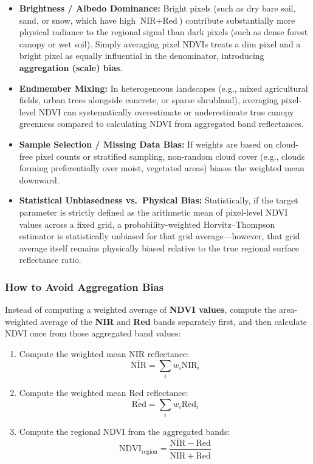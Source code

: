 \documentclass[12pt, letterpaper]{article}
\begin{document}
\begin{itemize}
    \item \textbf{Brightness / Albedo Dominance:} Bright pixels (such as dry bare soil, sand, or snow, which have high $\text{NIR} + \text{Red}$) contribute substantially more physical radiance to the regional signal than dark pixels (such as dense forest canopy or wet soil). Simply averaging pixel NDVIs treats a dim pixel and a bright pixel as equally influential in the denominator, introducing \textbf{aggregation (scale) bias}.
    \item \textbf{Endmember Mixing:} In heterogeneous landscapes (e.g., mixed agricultural fields, urban trees alongside concrete, or sparse shrubland), averaging pixel-level NDVI can systematically overestimate or underestimate true canopy greenness compared to calculating NDVI from aggregated band reflectances.
    \item \textbf{Sample Selection / Missing Data Bias:} If weights are based on cloud-free pixel counts or stratified sampling, non-random cloud cover (e.g., clouds forming preferentially over moist, vegetated areas) biases the weighted mean downward.
    \item \textbf{Statistical Unbiasedness vs.\ Physical Bias:} Statistically, if the target parameter is strictly defined as the arithmetic mean of pixel-level NDVI values across a fixed grid, a probability-weighted Horvitz--Thompson estimator is statistically unbiased for that grid average---however, that grid average itself remains physically biased relative to the true regional surface reflectance ratio.
\end{itemize}

\subsubsection*{How to Avoid Aggregation Bias}

Instead of computing a weighted average of \textbf{NDVI values}, compute the area-weighted average of the \textbf{NIR} and \textbf{Red} bands separately first, and then calculate NDVI once from those aggregated band values:

\begin{enumerate}
    \item Compute the weighted mean NIR reflectance:
    \begin{equation}
    \overline{\text{NIR}} = \sum_{i} w_i \text{NIR}_i
    \end{equation}
    \item Compute the weighted mean Red reflectance:
    \begin{equation}
    \overline{\text{Red}} = \sum_{i} w_i \text{Red}_i
    \end{equation}
    \item Compute the regional NDVI from the aggregated bands:
    \begin{equation}
    \text{NDVI}_{\text{region}} = \frac{\overline{\text{NIR}} - \overline{\text{Red}}}{\overline{\text{NIR}} + \overline{\text{Red}}}
    \end{equation}
\end{enumerate}
\end{document}
